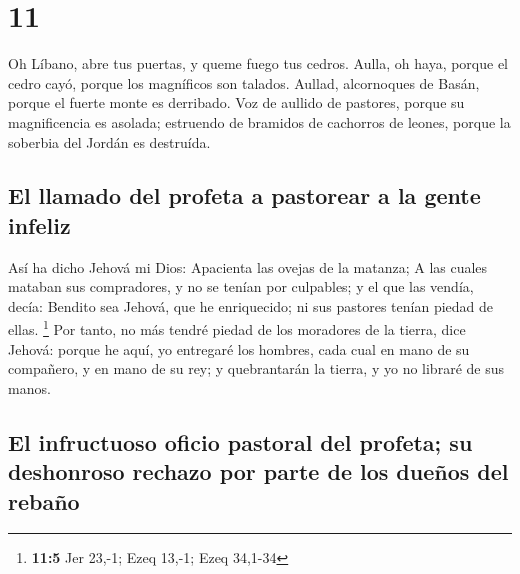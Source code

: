 \hypertarget{section-10}{%
\section{11}\label{section-10}}

 Oh Líbano, abre tus puertas, y queme fuego tus cedros.
 Aulla, oh haya, porque el cedro cayó, porque los magníficos
son talados. Aullad, alcornoques de Basán, porque el fuerte monte es
derribado.  Voz de aullido de pastores, porque su
magnificencia es asolada; estruendo de bramidos de cachorros de leones,
porque la soberbia del Jordán es destruída.

\hypertarget{el-llamado-del-profeta-a-pastorear-a-la-gente-infeliz}{%
\subsection{El llamado del profeta a pastorear a la gente
infeliz}\label{el-llamado-del-profeta-a-pastorear-a-la-gente-infeliz}}

 Así ha dicho Jehová mi Dios: Apacienta las ovejas de la
matanza;  A las cuales mataban sus compradores, y no se
tenían por culpables; y el que las vendía, decía: Bendito sea Jehová,
que he enriquecido; ni sus pastores tenían piedad de ellas. \footnote{\textbf{11:5}
  Jer 23,-1; Ezeq 13,-1; Ezeq 34,1-34}  Por tanto, no más
tendré piedad de los moradores de la tierra, dice Jehová: porque he
aquí, yo entregaré los hombres, cada cual en mano de su compañero, y en
mano de su rey; y quebrantarán la tierra, y yo no libraré de sus manos.

\hypertarget{el-infructuoso-oficio-pastoral-del-profeta-su-deshonroso-rechazo-por-parte-de-los-dueuxf1os-del-rebauxf1o}{%
\subsection{El infructuoso oficio pastoral del profeta; su deshonroso
rechazo por parte de los dueños del
rebaño}\label{el-infructuoso-oficio-pastoral-del-profeta-su-deshonroso-rechazo-por-parte-de-los-dueuxf1os-del-rebauxf1o}}


